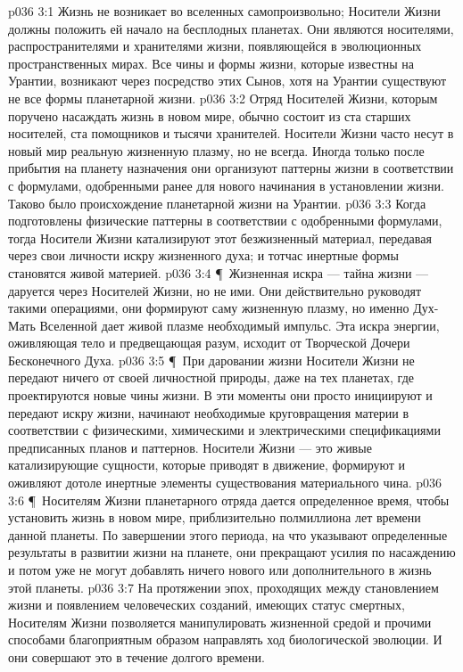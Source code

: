 \vs p036 3:1 Жизнь не возникает во вселенных самопроизвольно; Носители Жизни должны положить ей начало на бесплодных планетах. Они являются носителями, распространителями и хранителями жизни, появляющейся в эволюционных пространственных мирах. Все чины и формы жизни, которые известны на Урантии, возникают через посредство этих Сынов, хотя на Урантии существуют не все формы планетарной жизни.
\vs p036 3:2 Отряд Носителей Жизни, которым поручено насаждать жизнь в новом мире, обычно состоит из ста старших носителей, ста помощников и тысячи хранителей. Носители Жизни часто несут в новый мир реальную жизненную плазму, но не всегда. Иногда только после прибытия на планету назначения они организуют паттерны жизни в соответствии с формулами, одобренными ранее для нового начинания в установлении жизни. Таково было происхождение планетарной жизни на Урантии.
\vs p036 3:3 Когда подготовлены физические паттерны в соответствии с одобренными формулами, тогда Носители Жизни катализируют этот безжизненный материал, передавая через свои личности искру жизненного духа; и тотчас инертные формы становятся живой материей.
\vs p036 3:4 \P\ Жизненная искра --- тайна жизни --- даруется через Носителей Жизни, но не ими. Они действительно руководят такими операциями, они формируют саму жизненную плазму, но именно Дух\hyp{}Мать Вселенной дает живой плазме необходимый импульс. Эта искра энергии, оживляющая тело и предвещающая разум, исходит от Творческой Дочери Бесконечного Духа.
\vs p036 3:5 \P\ При даровании жизни Носители Жизни не передают ничего от своей личностной природы, даже на тех планетах, где проектируются новые чины жизни. В эти моменты они просто инициируют и передают искру жизни, начинают необходимые круговращения материи в соответствии с физическими, химическими и электрическими спецификациями предписанных планов и паттернов. Носители Жизни --- это живые катализирующие сущности, которые приводят в движение, формируют и оживляют дотоле инертные элементы существования материального чина.
\vs p036 3:6 \P\ Носителям Жизни планетарного отряда дается определенное время, чтобы установить жизнь в новом мире, приблизительно полмиллиона лет времени данной планеты. По завершении этого периода, на что указывают определенные результаты в развитии жизни на планете, они прекращают усилия по насаждению и потом уже не могут добавлять ничего нового или дополнительного в жизнь этой планеты.
\vs p036 3:7 На протяжении эпох, проходящих между становлением жизни и появлением человеческих созданий, имеющих статус смертных, Носителям Жизни позволяется манипулировать жизненной средой и прочими способами благоприятным образом направлять ход биологической эволюции. И они совершают это в течение долгого времени.
